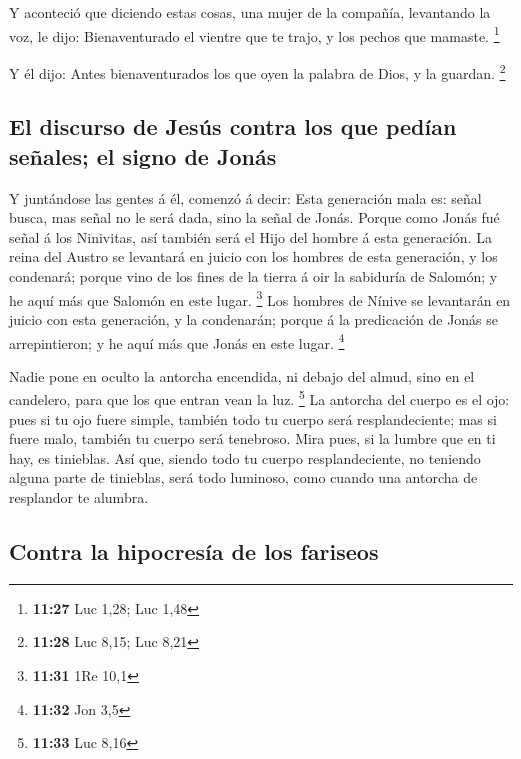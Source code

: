  Y aconteció que diciendo estas cosas, una mujer de la
compañía, levantando la voz, le dijo: Bienaventurado el vientre que te
trajo, y los pechos que mamaste. \footnote{\textbf{11:27} Luc 1,28; Luc
  1,48}

 Y él dijo: Antes bienaventurados los que oyen la palabra
de Dios, y la guardan. \footnote{\textbf{11:28} Luc 8,15; Luc 8,21}

\hypertarget{el-discurso-de-jesuxfas-contra-los-que-peduxedan-seuxf1ales-el-signo-de-jonuxe1s}{%
\subsection{El discurso de Jesús contra los que pedían señales; el signo
de
Jonás}\label{el-discurso-de-jesuxfas-contra-los-que-peduxedan-seuxf1ales-el-signo-de-jonuxe1s}}

 Y juntándose las gentes á él, comenzó á decir: Esta
generación mala es: señal busca, mas señal no le será dada, sino la
señal de Jonás.  Porque como Jonás fué señal á los
Ninivitas, así también será el Hijo del hombre á esta generación.
 La reina del Austro se levantará en juicio con los hombres
de esta generación, y los condenará; porque vino de los fines de la
tierra á oir la sabiduría de Salomón; y he aquí más que Salomón en este
lugar. \footnote{\textbf{11:31} 1Re 10,1}  Los hombres de
Nínive se levantarán en juicio con esta generación, y la condenarán;
porque á la predicación de Jonás se arrepintieron; y he aquí más que
Jonás en este lugar. \footnote{\textbf{11:32} Jon 3,5}

 Nadie pone en oculto la antorcha encendida, ni debajo del
almud, sino en el candelero, para que los que entran vean la luz.
\footnote{\textbf{11:33} Luc 8,16}  La antorcha del cuerpo
es el ojo: pues si tu ojo fuere simple, también todo tu cuerpo será
resplandeciente; mas si fuere malo, también tu cuerpo será tenebroso.
 Mira pues, si la lumbre que en ti hay, es tinieblas.
 Así que, siendo todo tu cuerpo resplandeciente, no
teniendo alguna parte de tinieblas, será todo luminoso, como cuando una
antorcha de resplandor te alumbra.

\hypertarget{contra-la-hipocresuxeda-de-los-fariseos}{%
\subsection{Contra la hipocresía de los
fariseos}\label{contra-la-hipocresuxeda-de-los-fariseos}}

